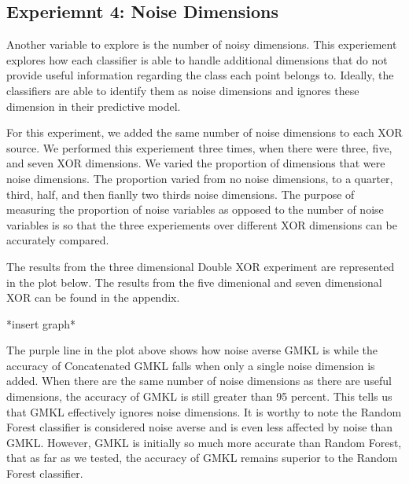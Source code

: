 \documentclass{article}
\begin{document}
\subsection{Experiemnt 4: Noise Dimensions}

Another variable to explore is the number of noisy dimensions. This experiement explores how each classifier is able to handle additional dimensions that do not provide useful information regarding the class each point belongs to. Ideally, the classifiers are able to identify them as noise dimensions and ignores these dimension in their predictive model. 

For this experiment, we added the same number of noise dimensions to each XOR source. We performed this experiement three times, when there were three, five, and seven XOR dimensions. We varied the proportion of dimensions that were noise dimensions. The proportion varied from no noise dimensions, to a quarter, third, half, and then fianlly two thirds noise dimensions. The purpose of measuring the proportion of noise variables as opposed to the number of noise variables is so that the three experiements over different XOR dimensions can be accurately compared. 

The results from the three dimensional Double XOR experiment are represented in the plot below. The results from the five dimenional and seven dimensional XOR can be found in the appendix. 

*insert graph*

The purple line in the plot above shows how noise averse GMKL is while the accuracy of Concatenated GMKL falls when only a single noise dimension is added. When there are the same number of noise dimensions as there are useful dimensions, the accuracy of GMKL is still greater than 95 percent. This tells us that GMKL effectively ignores noise dimensions. It is worthy to note the Random Forest classifier is considered noise averse and is even less affected by noise than GMKL. However, GMKL is initially so much more accurate than Random Forest, that as far as we tested, the accuracy of GMKL remains superior to the Random Forest classifier. 
\end{document}
